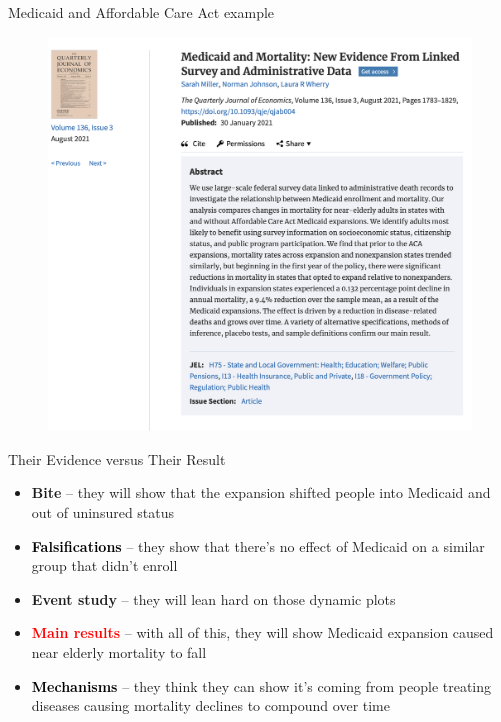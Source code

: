 \documentclass{beamer}
\begin{document}
\begin{frame}{Medicaid and Affordable Care Act example}

\begin{figure}
\includegraphics[scale=0.25]{./lecture_includes/medicaid_qje}
\end{figure}

\end{frame}
\begin{frame}{Their Evidence versus Their Result}

\begin{itemize}
\item \textbf{Bite} -- they will show that the expansion shifted people into Medicaid and out of uninsured status
\item \textcolor{black}{\textbf{Falsifications}} -- they show that there's no effect of Medicaid on a similar group that didn't enroll
\item \textbf{Event study} -- they will lean hard on those dynamic plots
\item \textcolor{red}{\textbf{Main results}} -- with all of this, they will show Medicaid expansion caused near elderly mortality to fall
\item \textcolor{black}{\textbf{Mechanisms}} -- they think they can show it's coming from people treating diseases causing mortality declines to compound over time
\end{itemize}

\end{frame}
\end{document}
